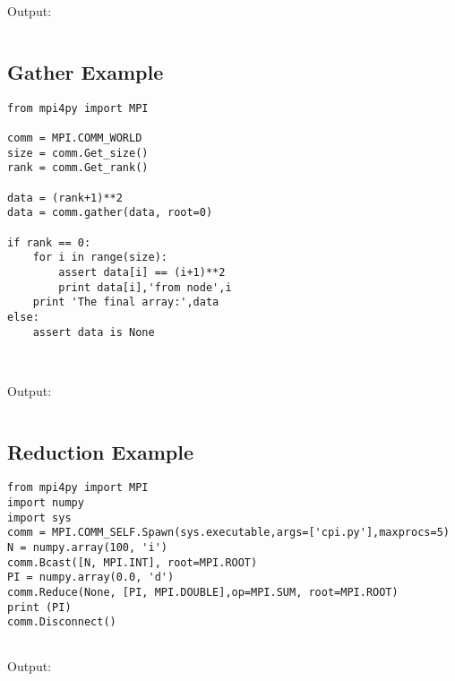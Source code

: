 Output:

\begin{verbatim}

\end{verbatim}

\subsection {Gather Example}
\label{appendix:gather}

\begin{verbatim}
from mpi4py import MPI

comm = MPI.COMM_WORLD
size = comm.Get_size()
rank = comm.Get_rank()

data = (rank+1)**2
data = comm.gather(data, root=0)

if rank == 0:
	for i in range(size):
		assert data[i] == (i+1)**2
		print data[i],'from node',i
	print 'The final array:',data
else:
	assert data is None



\end{verbatim}

Output:

\begin{verbatim}

\end{verbatim}

\subsection {Reduction Example}

\label{appendix:reduction}
\begin{verbatim}
from mpi4py import MPI
import numpy
import sys
comm = MPI.COMM_SELF.Spawn(sys.executable,args=['cpi.py'],maxprocs=5)
N = numpy.array(100, 'i')
comm.Bcast([N, MPI.INT], root=MPI.ROOT)
PI = numpy.array(0.0, 'd')
comm.Reduce(None, [PI, MPI.DOUBLE],op=MPI.SUM, root=MPI.ROOT)
print (PI)
comm.Disconnect()


\end{verbatim}

Output:

\begin{verbatim}

\end{verbatim}